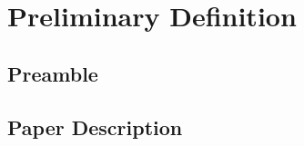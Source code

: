 
\chapter{Preliminary Definition} %

\label{AppendixDef} %



\section{Preamble}
\label{sec:def_preamble}


\section{Paper Description}
\label{sec:def_paper_description}

% 

% 
